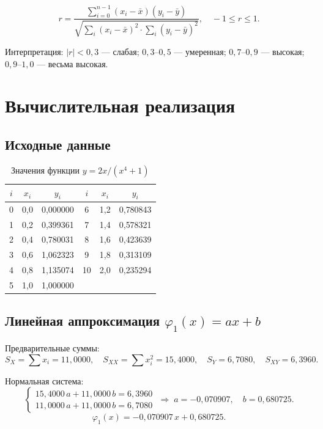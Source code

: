 \documentclass[12pt,a4paper]{article}
\begin{document}
\[
  r = \frac{\displaystyle\sum_{i=0}^{n-1}(x_i - \bar{x})(y_i - \bar{y})}
           {\sqrt{\displaystyle\sum_{i}(x_i-\bar{x})^2 \cdot \sum_{i}(y_i-\bar{y})^2}},
  \quad -1 \le r \le 1.
\]

Интерпретация: $|r| < 0{,}3$ — слабая; $0{,}3$--$0{,}5$ — умеренная;
$0{,}7$--$0{,}9$ — высокая; $0{,}9$--$1{,}0$ — весьма высокая.

\section{Вычислительная реализация}

\subsection{Исходные данные}

\begin{table}[H]
\centering
\caption{Значения функции $y = 2x/(x^4+1)$}
\begin{tabular}{c|c|c||c|c|c}
\toprule
$i$ & $x_i$ & $y_i$ & $i$ & $x_i$ & $y_i$ \\
\midrule
0  & 0{,}0 & 0{,}000000 & 6  & 1{,}2 & 0{,}780843 \\
1  & 0{,}2 & 0{,}399361 & 7  & 1{,}4 & 0{,}578321 \\
2  & 0{,}4 & 0{,}780031 & 8  & 1{,}6 & 0{,}423639 \\
3  & 0{,}6 & 1{,}062323 & 9  & 1{,}8 & 0{,}313109 \\
4  & 0{,}8 & 1{,}135074 & 10 & 2{,}0 & 0{,}235294 \\
5  & 1{,}0 & 1{,}000000 & & & \\
\bottomrule
\end{tabular}
\end{table}

\subsection{Линейная аппроксимация \texorpdfstring{$\varphi_1(x) = ax+b$}{}}

Предварительные суммы:
\[
  S_X = \sum x_i = 11{,}0000, \quad S_{XX} = \sum x_i^2 = 15{,}4000,
  \quad S_Y = 6{,}7080, \quad S_{XY} = 6{,}3960.
\]

Нормальная система:
\[
  \begin{cases}
    15{,}4000\,a + 11{,}0000\,b = 6{,}3960 \\
    11{,}0000\,a + 11{,}0000\,b = 6{,}7080
  \end{cases}
  \;\Longrightarrow\;
  a = -0{,}070907, \quad b = 0{,}680725.
\]
\[
  \varphi_1(x) = -0{,}070907\,x + 0{,}680725.
\]
\end{document}
